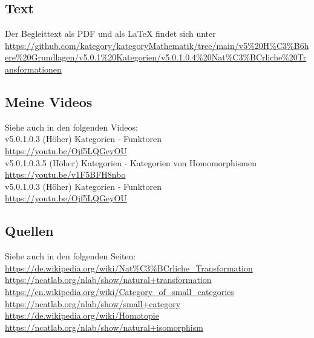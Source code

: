 \documentclass[a4paper]{amsart}
\theoremstyle{definition}
\begin{document}
\subsection*{Text}
Der Begleittext als PDF und als LaTeX findet sich unter
{\tiny
   \url{https://github.com/kategory/kategoryMathematik/tree/main/v5%20H%C3%B6here%20Grundlagen/v5.0.1%20Kategorien/v5.0.1.0.4%20Nat%C3%BCrliche%20Transformationen}
}

\subsection*{Meine Videos}
Siehe auch in den folgenden Videos:\\
v5.0.1.0.3 (Höher) Kategorien - Funktoren\\
\url{https://youtu.be/Ojf5LQGeyOU}\\
v5.0.1.0.3.5 (Höher) Kategorien - Kategorien von Homomorphismen\\
\url{https://youtu.be/v1F5BFH8nbo}\\
v5.0.1.0.3 (Höher) Kategorien - Funktoren\\
\url{https://youtu.be/Ojf5LQGeyOU}\\

\subsection*{Quellen}
Siehe auch in den folgenden Seiten:\\
\url{https://de.wikipedia.org/wiki/Nat%C3%BCrliche_Transformation}\\
\url{https://ncatlab.org/nlab/show/natural+transformation}\\
\url{https://en.wikipedia.org/wiki/Category_of_small_categories}\\
\url{https://ncatlab.org/nlab/show/small+category}\\
\url{https://de.wikipedia.org/wiki/Homotopie}\\
\url{https://ncatlab.org/nlab/show/natural+isomorphism}
\end{document}
